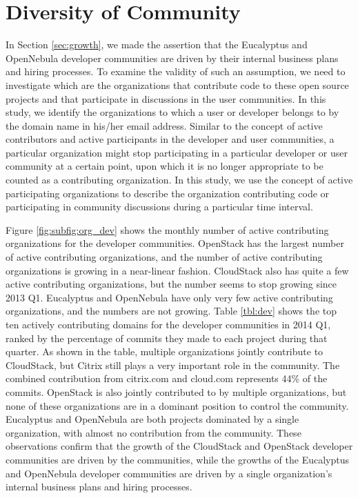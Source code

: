 \documentclass[conference]{IEEEtran}
\begin{document}
\section{Diversity of Community}
\label{sec:diversity}

In Section \ref{sec:growth}, we made the assertion that the Eucalyptus and OpenNebula developer communities are driven by their internal business plans and hiring processes. To examine the validity of such an assumption, we need to investigate which are the organizations that contribute code to these open source projects and that participate in discussions in the user communities. In this study, we identify the organizations to which a user or developer belongs to by the domain name in his/her email address. Similar to the concept of active contributors and active participants in the developer and user communities, a particular organization might stop participating in a particular developer or user community at a certain point, upon which it is no longer appropriate to be counted as a contributing organization. In this study, we use the concept of active participating organizations to describe the organization contributing code or participating in community discussions during a particular time interval.


Figure \ref{fig:subfig:org_dev} shows the monthly number of active contributing organizations for the developer communities. OpenStack has the largest number of active contributing organizations, and the number of active contributing organizations is growing in a near-linear fashion. CloudStack also has quite a few active contributing organizations, but the number seems to stop growing since 2013 Q1. Eucalyptus and OpenNebula have only very few active contributing organizations, and the numbers are not growing. Table \ref{tbl:dev} shows the top ten actively contributing domains for the developer communities in 2014 Q1, ranked by the percentage of commits they made to each project during that quarter. As shown in the table, multiple organizations jointly contribute to CloudStack, but Citrix still plays a very important role in the community. The combined contribution from citrix.com and cloud.com represents 44\% of the commits. OpenStack is also jointly contributed to by multiple organizations, but none of these organizations are in a dominant position to control the community. Eucalyptus and OpenNebula are both projects dominated by a single organization, with almost no contribution from the community. These observations confirm that the growth of the CloudStack and OpenStack developer communities are driven by the communities, while the growths of the Eucalyptus and OpenNebula developer communities are driven by a single organization's internal business plans and hiring processes.
\end{document}
